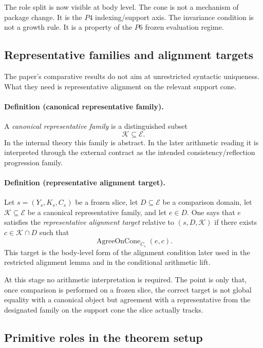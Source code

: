 The role split is now visible at body level. The cone is not a mechanism of package change. It is the \(P4\) indexing/support axis. The invariance condition is not a growth rule. It is a property of the \(P6\) frozen evaluation regime.

\subsection*{Representative families and alignment targets}

The paper's comparative results do not aim at unrestricted syntactic uniqueness. What they need is representative alignment on the relevant support cone.

\paragraph{Definition (canonical representative family).}
A \emph{canonical representative family} is a distinguished subset
\[
\mathcal{K}\subseteq \mathcal{E}.
\]
In the internal theory this family is abstract. In the later arithmetic reading it is interpreted through the external contract as the intended consistency/reflection progression family.

\paragraph{Definition (representative alignment target).}
Let $s=(Y_s,K_s,C_s)$ be a frozen slice, let $D\subseteq \mathcal{E}$ be a comparison domain, let $\mathcal{K}\subseteq \mathcal{E}$ be a canonical representative family, and let $e\in D$. One says that $e$ satisfies the \emph{representative alignment target} relative to $(s,D,\mathcal{K})$ if there exists $c\in \mathcal{K}\cap D$ such that
\[
\operatorname{AgreeOnCone}_{C_s}(e,c).
\]
This target is the body-level form of the alignment condition later used in the restricted alignment lemma and in the conditional arithmetic lift.

At this stage no arithmetic interpretation is required. The point is only that, once comparison is performed on a frozen slice, the correct target is not global equality with a canonical object but agreement with a representative from the designated family on the support cone the slice actually tracks.

\subsection*{Primitive roles in the theorem setup}

